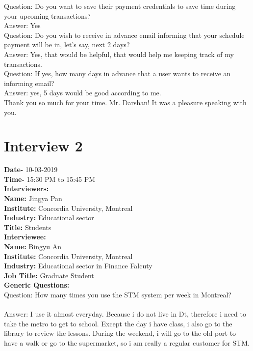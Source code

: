 \documentclass[11pt, english]{report}
\begin{document}
Question: Do you want to save their payment credentials to save time during your upcoming transactions?\\
Answer: Yes\\
 
Question: Do you wish to receive in advance email informing that your schedule payment will be in, let’s say, next 2 days?\\
Answer: Yes, that would be helpful, that would help me keeping track of my transactions.\\
 
Question: If yes, how many days in advance that a user wants to receive an informing email?\\
Answer: yes, 5 days would be good according to me.\\

Thank you so much for your time. Mr. Darshan! It was a pleasure speaking with you. \\


\newpage
\section{Interview 2}
\textbf{Date-} 10-03-2019\\
\textbf{Time-} 15:30 PM to 15:45 PM\\
\textbf{Interviewers:}\\

\textbf{Name:} Jingya Pan \\
\textbf{Institute:} Concordia University, Montreal \\
\textbf{Industry:} Educational sector\\
\textbf{Title:} Students \\ 

\textbf{Interviewee:}\\

\textbf{Name:} Bingyu An \\
\textbf{Institute:} Concordia University, Montreal \\
\textbf{Industry:} Educational sector in Finance Falcuty\\
\textbf{Job Title:} Graduate Student\\ 


\textbf{Generic Questions:}\\
Question: How many times you use the STM system per
week in Montreal? \\\\
Answer: I use it almost everyday. Because i do not live in Dt, therefore i need to take the metro to get to school. Except the day i have class, i also go to the library to review the lessons. During the weekend, i will go to the old port to have a walk or go to the supermarket, so i am really a regular customer for STM.\\
\end{document}
